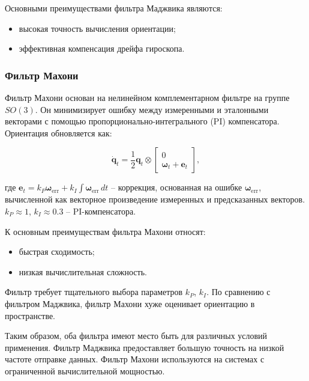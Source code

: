 Основными преимуществами фильтра Маджвика являются:
\begin{itemize}
	\item высокая точность вычисления ориентации;
	\item эффективная компенсация дрейфа гироскопа.
\end{itemize}

\subsubsection{Фильтр Махони}

Фильтр Махони основан на нелинейном комплементарном фильтре на группе \(SO(3)\).
Он минимизирует ошибку между измеренными и эталонными векторами с помощью пропорционально-интегрального (PI)
компенсатора. Ориентация обновляется как:

\begin{equation}
 \dot{\mathbf{q}}_t = \frac{1}{2} \mathbf{q}_t \otimes \begin{bmatrix} 0 \\ \boldsymbol{\omega}_t + \mathbf{e}_t \end{bmatrix},
\end{equation}
\begin{explanationx}
\item[где]
    \(\mathbf{e}_t = k_P \boldsymbol{\omega}_{\text{err}} + k_I \int \boldsymbol{\omega}_{\text{err}} \, dt\) --
    коррекция, основанная на ошибке \(\boldsymbol{\omega}_{\text{err}}\), 
    вычисленной как векторное произведение измеренных и предсказанных векторов.
    \(k_P \approx 1\), \(k_I \approx 0.3\) -- PI-компенсатора.
\end{explanationx}

К основным преимуществам фильтра Махони относят:
\begin{itemize}
	\item быстрая сходимость;
	\item низкая вычислительная сложность.
\end{itemize}

Фильтр требует тщательного выбора параметров \(k_P\), \(k_I\). По сравнению с фильтром Маджвика, 
фильтр Махони хуже оценивает ориентацию в пространстве.


Таким образом, оба фильтра имеют место быть для различных условий применения.
Фильтр Маджвика предоставляет большую точность на низкой частоте отправке данных.
Фильтр Махони используются на системах с ограниченной вычислительной мощностью.

